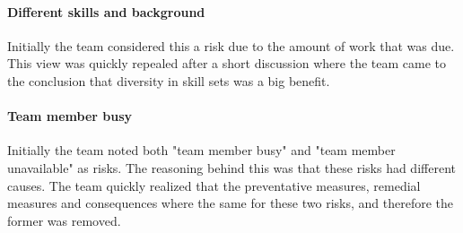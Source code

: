\paragraph{Different skills and background}
Initially the team considered this a risk due to the amount of work that was due. This view was quickly repealed after a short discussion where the team came to the conclusion that diversity in skill sets was a big benefit.

\paragraph{Team member busy}
Initially the team noted both "team member busy" and "team member unavailable" as risks. The reasoning behind this was that these risks had different causes. The team quickly realized that the preventative measures, remedial measures and consequences where the same for these two risks, and therefore the former was removed. 